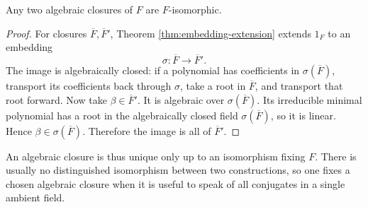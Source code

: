 \begin{theorem}
Any two algebraic closures of \(F\) are \(F\)-isomorphic.
\end{theorem}
\begin{proof}
For closures \(\overline F,\overline F'\), Theorem
\ref{thm:embedding-extension} extends \(1_F\) to an embedding
\[
\sigma:\overline F\longrightarrow\overline F'.
\]
The image is algebraically closed: if a polynomial has coefficients in
\(\sigma(\overline F)\), transport its coefficients back through \(\sigma\),
take a root in \(\overline F\), and transport that root forward.  Now take
\(\beta\in\overline F'\).  It is algebraic over \(\sigma(\overline F)\).
Its irreducible minimal polynomial has a root in the algebraically closed
field \(\sigma(\overline F)\), so it is linear.  Hence
\(\beta\in\sigma(\overline F)\).  Therefore the image is all of
\(\overline F'\).
\end{proof}

\begin{remark}
An algebraic closure is thus unique only up to an isomorphism fixing \(F\).
There is usually no distinguished isomorphism between two constructions, so one fixes
a chosen algebraic closure when it is useful to speak of all conjugates in a
single ambient field.
\end{remark}

